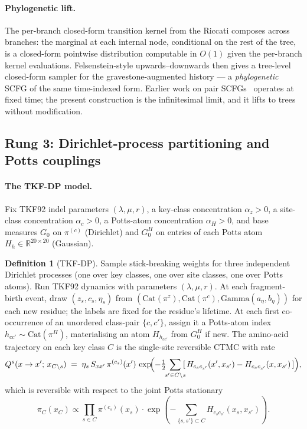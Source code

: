 \documentclass[11pt]{article}
\theoremstyle{definition}
\newtheorem{defn}[prop]{Definition}
\theoremstyle{remark}
\newcommand{\indel}{\ensuremath{(\lambda,\mu,r)}}
\begin{document}
\paragraph{Phylogenetic lift.}
The per-branch closed-form transition kernel from the Riccati
composes across branches: the marginal at each internal node,
conditional on the rest of the tree, is a closed-form pointwise
distribution computable in $O(1)$ given the per-branch kernel
evaluations. Felsenstein-style upwards--downwards then gives a
tree-level closed-form sampler for the gravestone-augmented
history --- a \emph{phylogenetic} SCFG of the same time-indexed
form. Earlier work on pair SCFGs~\citep{Sankoff85,KnudsenHein1999,HolmesRubin2002psb,Rivas2008}
operates at fixed time; the present construction is the
infinitesimal limit, and it lifts to trees without modification.

\subsection{Rung 3: Dirichlet-process partitioning and Potts couplings}
\label{sec:rung3}

\paragraph{The TKF-DP model.}
Fix TKF92 indel parameters \indel, a key-class concentration
$\alpha_z > 0$, a site-class concentration $\alpha_c > 0$, a
Potts-atom concentration $\alpha_H > 0$, and base measures
$G_0$ on $\pi^{(c)}$ (Dirichlet) and $G_0^H$ on entries of each
Potts atom $H_h \in \mathbb{R}^{20 \times 20}$ (Gaussian).
\begin{defn}[TKF-DP]
\label{defn:tkfdp}
Sample stick-breaking weights for three independent Dirichlet
processes (one over key classes, one over site classes, one over
Potts atoms). Run TKF92 dynamics with parameters \indel. At each
fragment-birth event, draw $(z_s, c_s, \eta_s)$ from
$(\mathrm{Cat}(\pi^z), \mathrm{Cat}(\pi^c), \mathrm{Gamma}(a_\eta, b_\eta))$
for each new residue; the labels are fixed for the residue's
lifetime. At each first co-occurrence of an unordered class-pair
$\{c, c'\}$, assign it a Potts-atom index $h_{cc'} \sim \mathrm{Cat}(\pi^H)$,
materialising an atom $H_{h_{cc'}}$ from $G_0^H$ if new. The amino-acid
trajectory on each key class $C$ is the single-site reversible
CTMC with rate
\[
Q^s(x \to x';\,x_{C\setminus s})
  \;=\; \eta_s \, S_{xx'} \, \pi^{(c_s)}(x') \,
        \exp\!\Bigl(-\tfrac{1}{2} \!\!\sum_{s' \in C \setminus s}\!\! [\,H_{c_s c_{s'}}(x', x_{s'}) - H_{c_s c_{s'}}(x, x_{s'})\,]\Bigr),
\]
which is reversible with respect to the joint Potts stationary
\[
\pi_C(x_C) \propto \prod_{s \in C} \pi^{(c_s)}(x_s) \cdot \exp(-\sum_{\{s, s'\} \subset C}\! H_{c_s c_{s'}}(x_s, x_{s'})).
\]
\end{defn}
\end{document}
